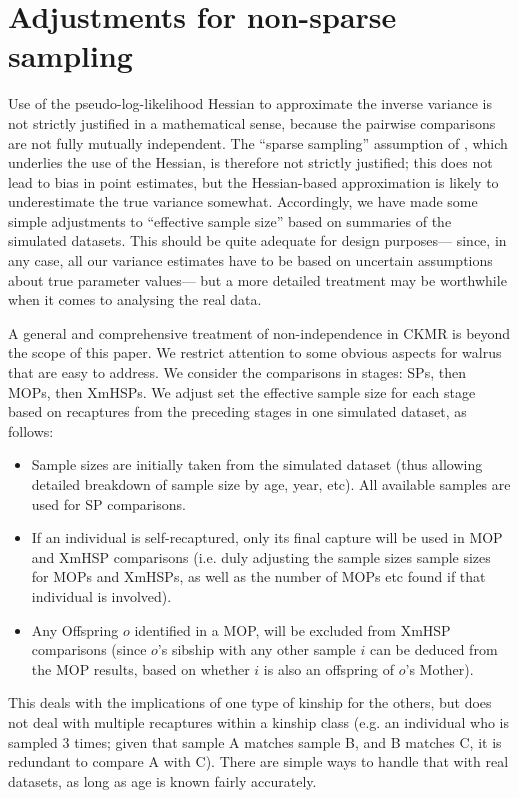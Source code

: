 \pagebreak{}

\section{Adjustments for non-sparse sampling\label{appendix:Adjustments-for-non-sparse}}

Use of the pseudo-log-likelihood Hessian to approximate the inverse
variance is not strictly justified in a mathematical sense, because
the pairwise comparisons are not fully mutually independent. The ``sparse
sampling'' assumption of \citet{bravington_close-kin_2016}, which
underlies the use of the Hessian, is therefore not strictly justified;
this does not lead to bias in point estimates, but the Hessian-based
approximation is likely to underestimate the true variance somewhat.
Accordingly, we have made some simple adjustments to ``effective
sample size'' based on summaries of the simulated datasets. This
should be quite adequate for design purposes— since, in any case,
all our variance estimates have to be based on uncertain assumptions
about true parameter values— but a more detailed treatment may be
worthwhile when it comes to analysing the real data.

A general and comprehensive treatment of non-independence in CKMR
is beyond the scope of this paper. We restrict attention to some obvious
aspects for walrus that are easy to address. We consider the comparisons
in stages: SPs, then MOPs, then XmHSPs. We adjust set the effective
sample size for each stage based on recaptures from the preceding
stages in one simulated dataset, as follows:
\begin{itemize}
\item Sample sizes are initially taken from the simulated dataset (thus
allowing detailed breakdown of sample size by age, year, etc). All
available samples are used for SP comparisons.
\item If an individual is self-recaptured, only its final capture will be
used in MOP and XmHSP comparisons (i.e. duly adjusting the sample
sizes sample sizes for MOPs and XmHSPs, as well as the number of MOPs
etc found if that individual is involved).
\item Any Offspring $o$ identified in a MOP, will be excluded from XmHSP
comparisons (since $o$'s sibship with any other sample $i$ can be
deduced from the MOP results, based on whether $i$ is also an offspring
of $o$'s Mother).
\end{itemize}
This deals with the implications of one type of kinship for the others,
but does not deal with multiple recaptures within a kinship class
(e.g. an individual who is sampled 3 times; given that sample A matches
sample B, and B matches C, it is redundant to compare A with C). There
are simple ways to handle that with real datasets, as long as age
is known fairly accurately.

